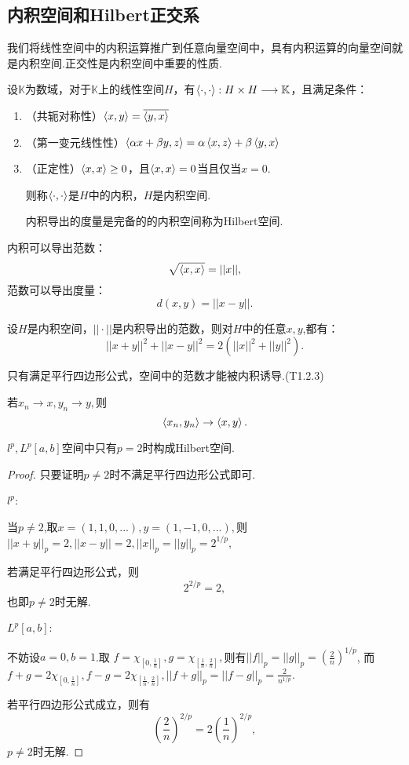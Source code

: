 \documentclass[lang=cn,10pt]{elegantbook}
\begin{document}
	\subsection{内积空间和Hilbert正交系}
	我们将线性空间中的内积运算推广到任意向量空间中，具有内积运算的向量空间就是内积空间.正交性是内积空间中重要的性质.
	\begin{definition}[内积空间]
		设\(\mathbb{K}\)为数域，对于\(\mathbb{K}\)上的线性空间\(H\)，有\(\Braket{\cdot ,\cdot }:H\times H\longrightarrow \mathbb{K}\)，且满足条件：
		\begin{enumerate}
			\item （共轭对称性）\(\Braket{x,y}=\overline{\Braket{y,x}}\)
			\item （第一变元线性性）\(\Braket{\alpha x+\beta y,z}=\alpha \Braket{x,z}+\beta \Braket{y,x}\)
			\item （正定性）\(\Braket{x,x}\ge 0\)，且\(\Braket{x,x}=0\)当且仅当\(x=0\).
			
			则称\(\Braket{\cdot ,\cdot }\)是\(H\)中的内积，\(H\)是内积空间.
			
			内积导出的度量是完备的的内积空间称为Hilbert空间.
		\end{enumerate}
	\end{definition}
	\begin{proposition}
		内积可以导出范数：
		\[\sqrt{\Braket{x,x}}=||x||,\]
		范数可以导出度量：
		\[d(x,y)=||x-y||.\]
	\end{proposition}
	\begin{proposition}[平行四边形公式(L1.2.5)]
		设\(H\)是内积空间，\(||\cdot ||\)是内积导出的范数，则对\(H\)中的任意\(x,y\),都有：
		\[||x+y||^2+||x-y||^2=2(||x||^2+||y||^2).\]
	\end{proposition}
	\begin{note}
		只有满足平行四边形公式，空间中的范数才能被内积诱导.(T1.2.3)
	\end{note}
	\begin{property}[内积的连续性]
		若\(x_n\to x,y_n \to y,\)则
		\[\Braket{x_n,y_n}\to \Braket{x,y}.\]
	\end{property}
	\begin{example}
		\(l^p,L^p[a,b]\)空间中只有\(p=2\)时构成Hilbert空间.
		\begin{proof}
			只要证明\(p\ne 2\)时不满足平行四边形公式即可.
			
			\(l^p\):
			
			当\(p \ne 2\),取\(x=(1,1,0,...),y=(1,-1,0,...),\)则\(||x+y||_p=2,||x-y||=2,||x||_p=||y||_p=2^{1/p}\),
			
			若满足平行四边形公式，则
			\[2^{2/p}=2,\]
			也即\(p\ne 2\)时无解.
			
			\(L^p[a,b]\):
			
			不妨设\(a=0,b=1\).取
			\(f=\chi_{[0,\frac{1}{n}]},g=\chi_{[\frac{1}{n},\frac{2}{n}]},\)则有\(||f||_p=||g||_p=(\frac{2}{n})^{1/p}\),
			而\(f+g=2\chi_{[0,\frac{1}{n}]},f-g=2\chi_{[\frac{1}{n},\frac{2}{n}]},||f+g||_p=||f-g||_p=\frac{2}{n^{1/p}}.\)
			
			若平行四边形公式成立，则有
			\[(\frac{2}{n})^{2/p}=2(\frac{1}{n})^{2/p},\]
			\(p\ne 2\)时无解.
		\end{proof}
	\end{example}
\end{document}

